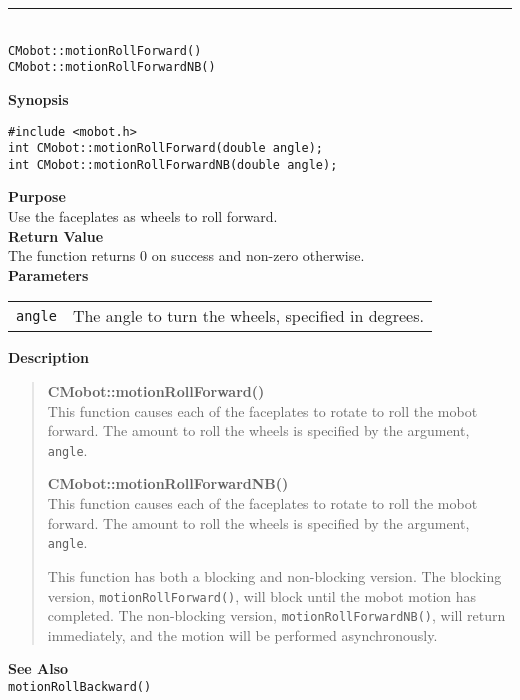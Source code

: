 \noindent
\vspace{5pt}
\rule{4.5in}{0.015in}\\
\noindent
{\LARGE \texttt{CMobot::motionRollForward()}}\\
{\LARGE \texttt{CMobot::motionRollForwardNB()}}\\
{}

\noindent
{\bf Synopsis}
\vspace{-8pt}
\begin{verbatim}
#include <mobot.h>
int CMobot::motionRollForward(double angle);
int CMobot::motionRollForwardNB(double angle);
\end{verbatim}

\noindent
{\bf Purpose}\\
Use the faceplates as wheels to roll forward.\\

\noindent
{\bf Return Value}\\
The function returns 0 on success and non-zero otherwise.\\

\noindent
{\bf Parameters}\\
\vspace{-0.1in}
\begin{description}
\item               
\begin{tabular}{p{15 mm}p{145 mm}}
\texttt{angle} & The angle to turn the wheels, specified in degrees.\\
\end{tabular}
\end{description}

\noindent
{\bf Description}\\
\vspace{-12pt}
\begin{quote}
{\bf CMobot::motionRollForward()}\\
This function causes each of the faceplates to rotate to roll the
mobot forward. The amount to roll the wheels is specified by the argument,
\texttt{angle}.

{\bf CMobot::motionRollForwardNB()}\\
This function causes each of the faceplates to rotate to roll the
mobot forward. The amount to roll the wheels is specified by the argument,
\texttt{angle}.

This function has both a blocking and non-blocking version.
The blocking version, \texttt{motionRollForward()}, will block until the
mobot motion has completed. The non-blocking version, \texttt{motionRollForwardNB()},
will return immediately, and the motion will be performed asynchronously.\\
\end{quote}

\noindent
{\bf See Also}\\
\texttt{motionRollBackward()}

